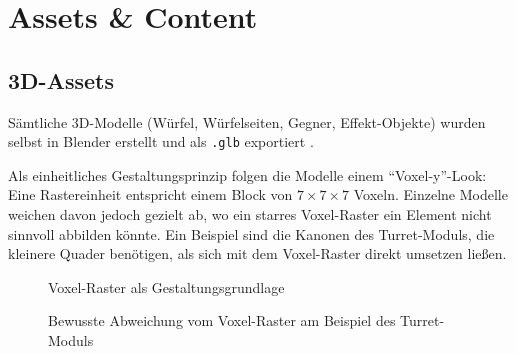 \documentclass[oneside]{ausarbeitung}
\begin{document}


\chapter{Assets \& Content}
\label{cha:assets}

\section{3D-Assets}

Sämtliche 3D-Modelle (Würfel, Würfelseiten, Gegner, Effekt-Objekte) wurden selbst in Blender erstellt
und als \texttt{.glb} exportiert .


Als einheitliches Gestaltungsprinzip folgen die Modelle einem \enquote{Voxel-y}-Look: Eine Rastereinheit
entspricht einem Block von $7 \times 7 \times 7$ Voxeln. Einzelne Modelle weichen davon jedoch gezielt ab, wo ein starres Voxel-Raster ein Element nicht sinnvoll abbilden könnte. Ein Beispiel sind die Kanonen des Turret-Moduls, die kleinere Quader benötigen, als sich mit dem Voxel-Raster direkt umsetzen ließen.

\begin{figure}[h]
    \centering
    \caption{Voxel-Raster als Gestaltungsgrundlage}
    \label{fig:voxel-raster}
\end{figure}

\begin{figure}[h]
    \centering
    \caption{Bewusste Abweichung vom Voxel-Raster am Beispiel des Turret-Moduls}
    \label{fig:voxel-abweichung}
\end{figure}
\end{document}
